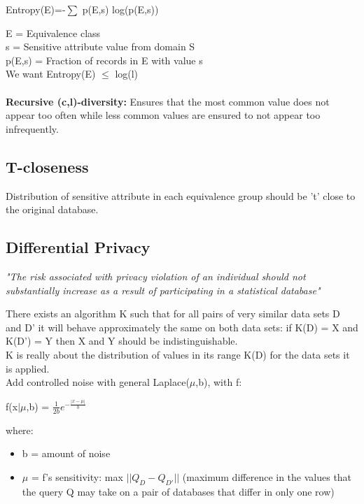 \documentclass{article}
\begin{document}
\begin{center}
    Entropy(E)=-$\sum$ p(E,s) log(p(E,s))
\end{center}
E = Equivalence class\\
s = Sensitive attribute value from domain S\\
p(E,s) = Fraction of records in E with value s\\
We want Entropy(E) $\leq$ log(l)\\\\
\textbf{Recursive (c,l)-diversity:} Ensures that the most common value does not appear too often while less common values are ensured to not appear too infrequently.

\subsection{T-closeness}
Distribution of sensitive attribute in each equivalence group should be 't' close to the original database.

\subsection{Differential Privacy}
\begin{center}
    \textit{"The risk associated with privacy violation of an individual should not substantially increase as a result of participating in a statistical database"}
\end{center}
There exists an algorithm K such that for all pairs of very similar data sets D and D' it will behave approximately the same on both data sets: if K(D) = X and K(D') = Y then X and Y should be indistinguishable.\\
K is really about the distribution of values in its range K(D) for the data sets it is applied.\\
Add controlled noise with general Laplace($\mu$,b), with f:
\begin{center}
    f(x$|\mu$,b) = $\frac{1}{2b} e^{-\frac{|x-\mu|}{b}}$
\end{center}
where:
\begin{itemize}
    \item b = amount of noise
    \item $\mu$ = f's sensitivity: max $|| Q_D - Q_{D'}||$
    (maximum difference in the values that the query Q may take on a pair of databases that differ in only one row)
\end{itemize}
\end{document}
